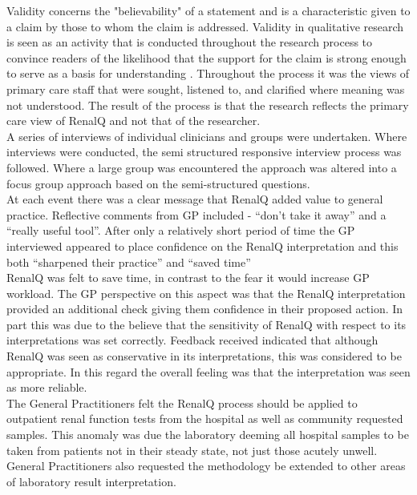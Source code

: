 \documentclass[11pt]{article}
\begin{document}
Validity concerns the "believability" of a statement and is a characteristic given to a claim by those to whom the claim is addressed. Validity in qualitative research is seen as an activity that is conducted throughout the research process \citep{morse2002verification, kvale2009interviews} to convince readers of the likelihood that the support for the claim is strong enough to serve as a basis for understanding \citep{polkinghorne2007validity}. Throughout the process it was the views of primary care staff that were sought, listened to, and clarified where meaning was not understood. The result of the process is that the research reflects the primary care view of RenalQ and not that of the researcher.\\

A series of interviews of individual clinicians and groups were undertaken. Where interviews were conducted, the semi structured responsive interview process was followed. Where a large group was encountered the approach was altered into a focus group approach based on the semi-structured questions.\\

At each event there was a clear message that RenalQ added value to general practice. Reflective comments from GP included - “don’t take it away” and a “really useful tool”. After only a relatively short period of time the GP interviewed appeared to place confidence on the RenalQ interpretation and this both “sharpened their practice” and “saved time”\\

RenalQ was felt to save time, in contrast to the fear it would increase GP workload. The GP perspective on this aspect was that the RenalQ interpretation provided an additional check giving them confidence in their proposed action. In part this was due to the believe that the sensitivity of RenalQ with respect to its interpretations was set correctly. Feedback received indicated that although RenalQ was seen as conservative in its interpretations, this was considered to be appropriate. In this regard the overall feeling was that the interpretation was seen as more reliable.\\

The General Practitioners felt the RenalQ process should be applied to outpatient renal function tests from the hospital as well as community requested samples. This anomaly was due the laboratory deeming all hospital samples to be taken from patients not in their steady state, not just those acutely unwell. General Practitioners also requested the methodology be extended to other areas of laboratory result interpretation.
\end{document}
